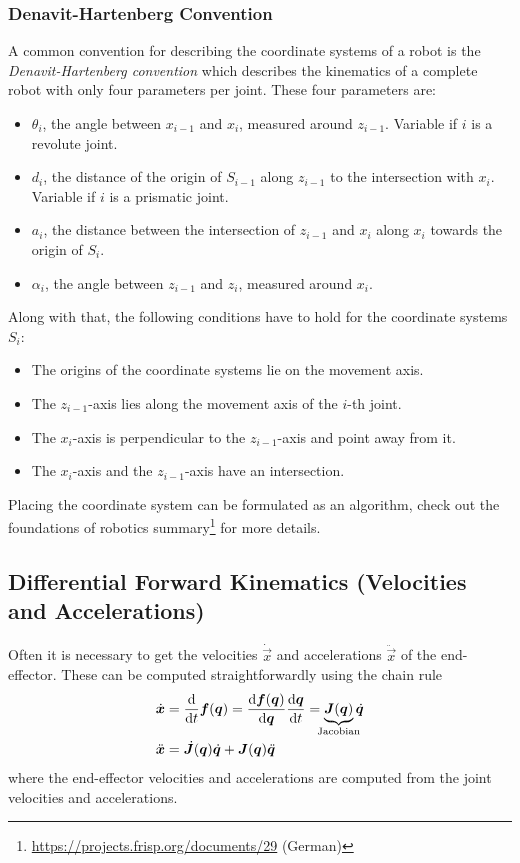 			\subsubsection{Denavit-Hartenberg Convention}
				A common convention for describing the coordinate systems of a robot is the \emph{Denavit-Hartenberg convention} which describes the kinematics of a complete robot with only four parameters per joint. These four parameters are:
				\begin{itemize}
					\item \(\theta_i\), the angle between \(x_{i - 1}\) and \(x_i\), measured around \(z_{i - 1}\). Variable if \(i\) is a revolute joint.
					\item \(d_i\), the distance of the origin of \(S_{i - 1}\) along \(z_{i - 1}\) to the intersection with \(x_i\). Variable if \(i\) is a prismatic joint.
					\item \(a_i\), the distance between the intersection of \(z_{i - 1}\) and \(x_i\) along \(x_i\) towards the origin of \(S_i\).
					\item \(\alpha_i\), the angle between \(z_{i - 1}\) and \(z_i\), measured around \(x_i\).
				\end{itemize}
				Along with that, the following conditions have to hold for the coordinate systems \(S_i\):
				\begin{itemize}
					\item The origins of the coordinate systems lie on the movement axis.
					\item The \(z_{i - 1}\)-axis lies along the movement axis of the \(i\)-th joint.
					\item The \(x_i\)-axis is perpendicular to the \(z_{i - 1}\)-axis and point away from it.
					\item The \(x_i\)-axis and the \(z_{i - 1}\)-axis have an intersection.
				\end{itemize}
				Placing the coordinate system can be formulated as an algorithm, check out the foundations of robotics summary\footnote{\url{https://projects.frisp.org/documents/29} (German)} for more details.

		\subsection{Differential Forward Kinematics (Velocities and Accelerations)}
			Often it is necessary to get the velocities \(\dot{\vec{x}}\) and accelerations \(\ddot{\vec{x}}\) of the end-effector. These can be computed straightforwardly using the chain rule
			\begin{align}
				\dot{\vec{x}}  & = \dv{t} \vec{f}(\vec{q}) = \dv{\vec{f}(\vec{q})}{\vec{q}} \dv{\vec{q}}{t} = \underbrace{\mat{J}(\vec{q})}_{\mathclap{\text{Jacobian}}} \dot{\vec{q}}  \label{eq:diffForwardKin} \\
				\ddot{\vec{x}} & = \dot{\mat{J}}(\vec{q}) \dot{\vec{q}} + \mat{J}(\vec{q}) \ddot{\vec{q}}  \nonumber
			\end{align}
			where the end-effector velocities and accelerations are computed from the joint velocities and accelerations.

